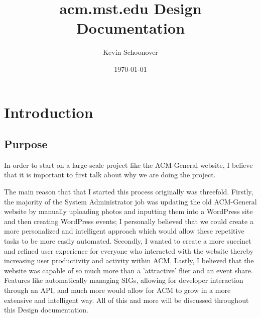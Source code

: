 \documentclass{article}
\title{acm.mst.edu Design Documentation}
\author{Kevin Schoonover}
\date{\today}
\begin{document}
\maketitle

\tableofcontents

\section{Introduction}
\subsection{Purpose}
In order to start on a large-scale project like the ACM-General website, I
believe that it is important to first talk about why we are doing the project.

The main reason that that I started this process originally was threefold.
Firstly, the majority of the System Administrator job was updating
the old ACM-General website by manually uploading photos and inputting them into
a WordPress site and then creating WordPress events; I personally believed that we
could create a more personalized and intelligent approach which would allow these
repetitive tasks to be more easily automated. Secondly, I wanted to create a 
more succinct and refined user experience for everyone who interacted with the 
website thereby increasing user productivity and activity within ACM. 
Lastly, I believed that the website was capable of so much more than a 
'attractive' flier and an event share. Features like automatically managing SIGs, 
allowing for developer interaction through an API, and much more would allow
for ACM to grow in a more extensive and intelligent way. All of this and 
more will be discussed throughout this Design documentation.
\end{document}

